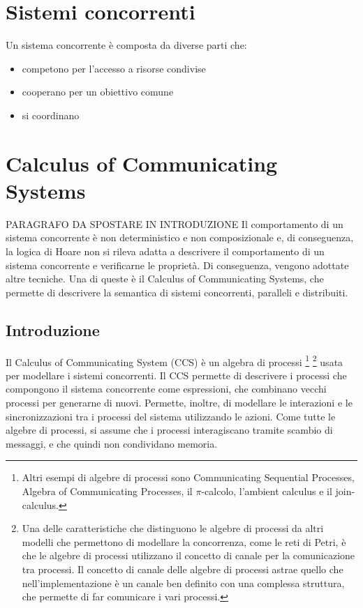 \chapter{Sistemi concorrenti}
Un sistema concorrente è composta da diverse parti che:
\begin{itemize}
    \item competono per l'accesso a risorse condivise
    \item cooperano per un obiettivo comune
    \item si coordinano
\end{itemize}

\chapter{Calculus of Communicating Systems}
PARAGRAFO DA SPOSTARE IN INTRODUZIONE
Il comportamento di un sistema concorrente è non deterministico e non composizionale
e, di conseguenza, la logica di Hoare non si rileva adatta a descrivere
il comportamento di un sistema concorrente e verificarne le proprietà.
Di conseguenza, vengono adottate altre tecniche. Una di queste è il Calculus
of Communicating Systems, che permette di descrivere la semantica di sistemi
concorrenti, paralleli e distribuiti.

\section{Introduzione}
Il Calculus of Communicating System (CCS) è un algebra di processi
\footnote{Altri esempi di algebre di processi sono Communicating Sequential
Processes, Algebra of Communicating Processes, il $\pi$-calcolo, l'ambient
calculus e il join-calculus.}
\footnote{Una delle caratteristiche che distinguono le algebre di processi
da altri modelli che permettono di modellare la concorrenza, come le reti
di Petri, è che le algebre di processi utilizzano il concetto di canale
per la comunicazione tra processi. Il concetto di canale delle algebre di
processi astrae quello che nell'implementazione è un canale ben definito con
una complessa struttura, che permette di far comunicare i vari processi.}
usata per modellare i sistemi concorrenti. Il CCS permette di descrivere
i processi che compongono il sistema concorrente come espressioni, che combinano
vecchi processi per generarne di nuovi. Permette, inoltre, di modellare
le interazioni e le sincronizzazioni tra i processi del sistema utilizzando
le azioni.
Come tutte le algebre di processi, si assume che i processi interagiscano
tramite scambio di messaggi, e che quindi non condividano memoria.

